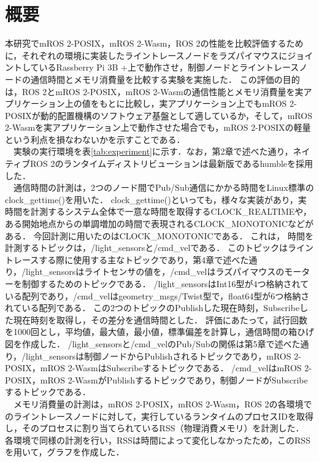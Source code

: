 \section{概要}
本研究でmROS 2-POSIX，mROS 2-Wasm，ROS 2の性能を比較評価するために，それぞれの環境に実装したライントレースノードをラズパイマウスにジョイントしているRassberry Pi 3B +上で動作させ，制御ノードとライントレースノードの通信時間とメモリ消費量を比較する実験を実施した．
この評価の目的は，ROS 2とmROS 2-POSIX，mROS 2-Wasmの通信性能とメモリ消費量を実アプリケーション上の値をもとに比較し，実アプリケーション上でもmROS 2-POSIXが動的配置機構のソフトウェア基盤として適しているか，そして，mROS 2-Wasmを実アプリケーション上で動作させた場合でも，mROS 2-POSIXの軽量という利点を損なわないかを示すことである．
\\　実験の実行環境を表\ref{tab:experiment}に示す．なお，第2章で述べた通り，ネイティブROS 2のランタイムディストリビューションは最新版であるhumbleを採用した．
\\　通信時間の計測は，2つのノード間でPub/Sub通信にかかる時間をLinux標準のclock\_gettime()を用いた．
clock\_gettime()といっても，様々な実装があり，実時間を計測するシステム全体で一意な時間を取得するCLOCK\_REALTIMEや，ある開始地点からの単調増加の時間で表現されるCLOCK\_MONOTONICなどがある．
今回計測に用いたのはCLOCK\_MONOTONICである．
これは，
時間を計測するトピックは，/light\_sensorsと/cmd\_velである．
このトピックはライントレースする際に使用する主なトピックであり，第4章で述べた通り，/light\_sensorsはライトセンサの値を，/cmd\_velはラズパイマウスのモーターを制御するためのトピックである．
/light\_sensorsはInt16型が4つ格納されている配列であり，/cmd\_velはgeometry\_msgs/Twist型で，float64型が6つ格納されている配列である．
この2つのトピックのPublishした現在時刻，Subscribeした現在時刻を取得し，その差分を通信時間とした．
評価にあたって，試行回数を1000回とし，平均値，最大値，最小値，標準偏差を計算し，通信時間の箱ひげ図を作成した．
/light\_sensorsと/cmd\_velのPub/Subの関係は第5章で述べた通り，/light\_sensorsは制御ノードからPublishされるトピックであり，mROS 2-POSIX，mROS 2-WasmはSubscribeするトピックである．
/cmd\_velはmROS 2-POSIX，mROS 2-WasmがPublishするトピックであり，制御ノードがSubscribeするトピックである．
\\　メモリ消費量の計測は，mROS 2-POSIX，mROS 2-Wasm，ROS 2の各環境でのライントレースノードに対して，実行しているランタイムのプロセスIDを取得し，そのプロセスに割り当てられているRSS（物理消費メモリ）を計測した．
各環境で同様の計測を行い，RSSは時間によって変化しなかったため，このRSSを用いて，グラフを作成した．
